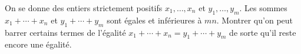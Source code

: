 On se donne des entiers strictement positifs $x_1, \ldots, x_n$ et $y_1, \ldots, y_m$. Les sommes $x_1 + \cdots + x_n$ et $y_1 + \cdots + y_m$ sont égales et inférieures à $mn$. Montrer qu'on peut barrer certains termes de l'égalité $x_1 + \cdots + x_n = y_1 + \cdots + y_m$ de sorte qu'il reste encore une égalité.
